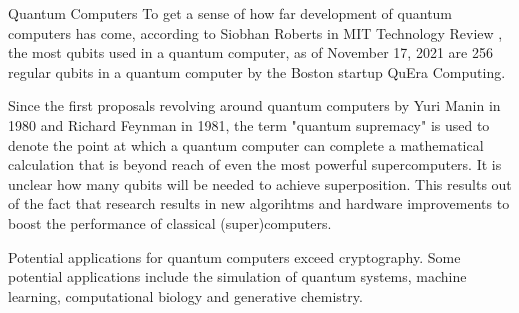 \documentclass[aps,preprintnumbers,twocolumn]{revtex4}
\begin{document}
\begin{section}{Quantum Computers}
To get a sense of how far development of quantum computers has come, 
according to Siobhan Roberts in MIT Technology Review \cite{MIT}, 
the most qubits used in a quantum computer, 
as of November 17, 2021 are 256 regular qubits in a quantum computer by the Boston startup QuEra Computing. 

Since the first proposals revolving around quantum computers by Yuri Manin in 1980 and Richard Feynman in 1981,
the term "quantum supremacy" is used to denote the point at which a quantum computer can complete a mathematical calculation that is beyond reach of even the most powerful supercomputers.
It is unclear how many qubits will be needed to achieve superposition. 
This results out of the fact that research results in new algorihtms and hardware improvements to boost the performance of classical (super)computers. 

Potential applications for quantum computers exceed cryptography. Some potential applications include the simulation of quantum systems, machine learning, computational biology and generative chemistry. 
\end{section}
\end{document}
